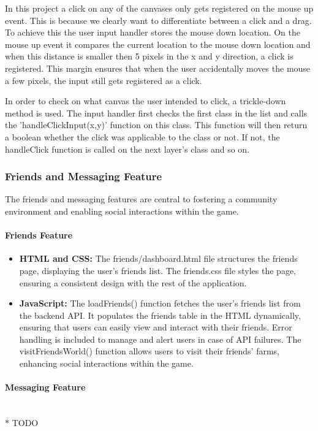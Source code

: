 \documentclass[12pt]{article}
\begin{document}
In this project a click on any of the canvases only gets registered on the mouse up event. This is because we clearly
want to differentiate between a click and a drag. To achieve this the user input handler stores the mouse down location.
On the mouse up event it compares the current location to the mouse down location and when this distance is smaller then
5 pixels in the x and y direction, a click is registered. This margin ensures that when the user accidentally moves the
mouse a few pixels, the input still gets registered as a click.

In order to check on what canvas the user intended to click, a trickle-down method is used. The input handler first
checks the first class in the list and calls the 'handleClickInput(x,y)' function on this class. This function will then
return a boolean whether the click was applicable to the class or not. If not, the handleClick function is called on the
next layer's class and so on.


\subsubsection{Friends and Messaging Feature}
The friends and messaging features are central to fostering a community environment and enabling social interactions within the game.
\paragraph{Friends Feature}
\begin{itemize}
    \item \textbf{HTML and CSS:} The friends/dashboard.html file structures the friends page, displaying the user's friends list. The friends.css file styles the page, ensuring a consistent design with the rest of the application.
    \item \textbf{JavaScript:} The loadFriends() function fetches the user's friends list from the backend API. It populates the friends table in the HTML dynamically, ensuring that users can easily view and interact with their friends. Error handling is included to manage and alert users in case of API failures. The visitFriendsWorld() function allows users to visit their friends' farms, enhancing social interactions within the game.
\end{itemize}
\paragraph{Messaging Feature}
\\ $\ast$ TODO
\end{document}
